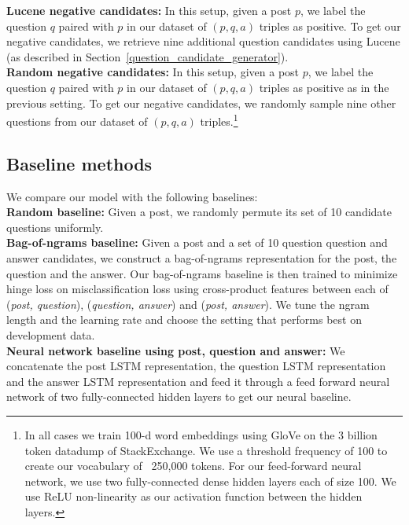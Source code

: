 \documentclass[11pt,a4paper]{article}
\begin{document}
\textbf{Lucene negative candidates:} In this setup, given a post $p$, we label the question $q$ paired with $p$ in our dataset of $(p, q, a)$ triples as positive. To get our negative candidates, we retrieve nine additional question candidates using Lucene (as described in Section~\ref{question_candidate_generator}).\\
\textbf{Random negative candidates:} In this setup, given a post $p$, we label the question $q$ paired with $p$ in our dataset of $(p, q, a)$ triples as positive as in the previous setting. To get our negative candidates, we randomly sample nine other questions from our dataset of $(p, q, a)$ triples.\footnote{In all cases we train 100-d word embeddings using GloVe \cite{pennington2014glove} on the 3 billion token datadump of StackExchange. We use a threshold frequency of 100 to create our vocabulary of ~250,000 tokens. For our feed-forward neural network, we use two fully-connected dense hidden layers each of size 100. We use ReLU \cite{nair2010rectified} non-linearity as our activation function between the hidden layers.}


\subsection{Baseline methods}\label{baselines}

We compare our model with the following baselines:\\
\textbf{Random baseline:} Given a post, we randomly permute its set of 10 candidate questions uniformly.\\
\textbf{Bag-of-ngrams baseline:} Given a post and a set of 10 question question and answer candidates, we construct a bag-of-ngrams representation for the post, the question and the answer. Our bag-of-ngrams baseline is then trained to minimize hinge loss on misclassification loss using cross-product features between each of (\textit{post, question}), (\textit{question, answer}) and (\textit{post, answer}). We tune the ngram length and the learning rate and choose the setting that performs best on development data.\\
\textbf{Neural network baseline using post, question and answer:} We concatenate the post LSTM representation, the question LSTM representation and the answer LSTM representation and feed it through a feed forward neural network of two fully-connected hidden layers to get our neural baseline. 
\end{document}
